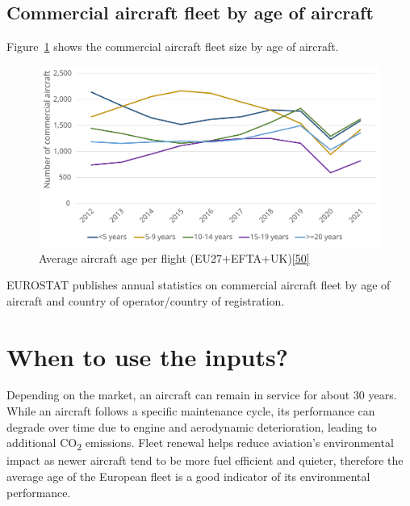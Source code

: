 \documentclass[
  11pt,
  a4paper,
]{book}
\begin{document}
\hypertarget{commercial-aircraft-fleet-by-age-of-aircraft}{%
\subsection{Commercial aircraft fleet by age of
aircraft}\label{commercial-aircraft-fleet-by-age-of-aircraft}}

Figure~\ref{fig-com-aircraft-fleet} shows the commercial aircraft fleet
size by age of aircraft.

\begin{figure}

{\centering \includegraphics{chapters/../figures/aircraft-fleet-by-age.svg}

}

\caption{\label{fig-com-aircraft-fleet}Average aircraft age per flight
(EU27+EFTA+UK)\protect\hyperlink{ref-eurostataircraftfleet}{{[}50{]}}}

\end{figure}

EUROSTAT publishes annual statistics on commercial aircraft fleet by age
of aircraft and country of operator/country of registration.

\hypertarget{when-to-use-the-inputs-1}{%
\section{When to use the inputs?}\label{when-to-use-the-inputs-1}}

Depending on the market, an aircraft can remain in service for about 30
years. While an aircraft follows a specific maintenance cycle, its
performance can degrade over time due to engine and aerodynamic
deterioration, leading to additional CO\textsubscript{2} emissions.
Fleet renewal helps reduce aviation's environmental impact as newer
aircraft tend to be more fuel efficient and quieter, therefore the
average age of the European fleet is a good indicator of its
environmental performance.
\end{document}

